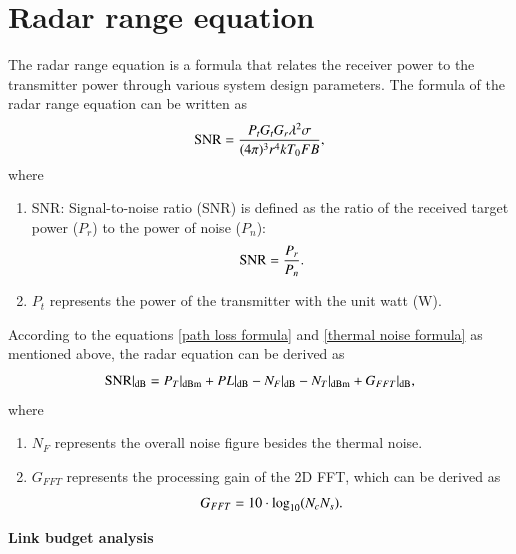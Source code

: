 \documentclass[12pt,DIV14,BCOR12mm,a4paper,footinclude=false,headinclude,parskip=half-,twoside,openright,cleardoublepage=empty,toc=index,bibliography=totoc,listof=totoc]{scrreprt}
\numberwithin{equation}{chapter}
\begin{document}
\section{Radar range equation} \label{Radar range equation}
The radar range equation \cite{richards_principles_2010} is a formula that relates the receiver power to the transmitter power through various system design parameters. The formula of the radar range equation can be written as
\begin{equation}
    \centering
    \text{SNR} = \frac{P_t G_t G_r \lambda^2 \sigma}{(4 \pi)^3 r^4 k T_0 F B},
\end{equation}
where
\begin{enumerate}[label=\textbullet]

    \item SNR: Signal-to-noise ratio (SNR) is defined as the ratio of the received target power ($P_r$) to the power of noise ($P_n$):
    \begin{equation}
        \centering
        \text{SNR} = \frac{P_r}{P_n}.
    \end{equation}

    \item $P_t$ represents the power of the transmitter with the unit watt (W).

\end{enumerate}
According to the equations \ref{path loss formula} and \ref{thermal noise formula} as mentioned above, the radar equation can be derived as
\begin{equation}
    \centering
    \text{SNR} \vert \textsubscript{dB} = P_{T} \vert \textsubscript{dBm} + PL \vert \textsubscript{dB} - N_{F} \vert \textsubscript{dB} - N_{T} \vert \textsubscript{dBm} + G_{FFT} \vert \textsubscript{dB},
    \label{radar equation formula}
\end{equation}
where
\begin{enumerate}[label=\textbullet]
    \item $N_F$ represents the overall noise figure besides the thermal noise.
    \item $G_{FFT}$ represents the processing gain of the 2D FFT, which can be derived as
        \begin{equation}
            \centering
            G_{FFT} = 10\cdot\log_{10}(N_{c}N_{s}).
            \label{FFT gain formula}
        \end{equation}
\end{enumerate}


\begin{spacing}{1.5}
\textbf{\large{Link budget analysis}}
\end{spacing}
\end{document}
